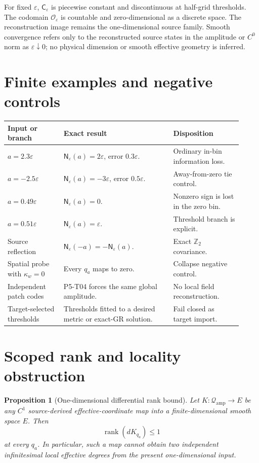 \documentclass[11pt]{article}
\newcommand{\Qamp}{\mathcal Q_{\mathrm{amp}}}
\newcommand{\Oeps}{\mathcal O_\varepsilon}
\newcommand{\Ceps}{\mathsf C_\varepsilon}
\newcommand{\Neps}{\mathsf N_\varepsilon}
\newtheorem{proposition}{Proposition}
\begin{document}
For fixed \(\varepsilon\), \(\Ceps\) is piecewise constant and discontinuous
at half-grid thresholds.  The codomain \(\Oeps\) is countable and
zero-dimensional as a discrete space.  The reconstruction image remains the
one-dimensional source family.  Smooth convergence refers only to the
reconstructed source states in the amplitude or \(C^0\) norm as
\(\varepsilon\downarrow0\); no physical dimension or smooth effective
geometry is inferred.

\section{Finite examples and negative controls}

\begin{longtable}{p{0.22\linewidth}p{0.43\linewidth}p{0.27\linewidth}}
\toprule
Input or branch & Exact result & Disposition\\
\midrule
\endhead
\(a=2.3\varepsilon\) &
\(\Neps(a)=2\varepsilon\), error \(0.3\varepsilon\). &
Ordinary in-bin information loss.\\
\(a=-2.5\varepsilon\) &
\(\Neps(a)=-3\varepsilon\), error \(0.5\varepsilon\). &
Away-from-zero tie control.\\
\(a=0.49\varepsilon\) &
\(\Neps(a)=0\). &
Nonzero sign is lost in the zero bin.\\
\(a=0.51\varepsilon\) &
\(\Neps(a)=\varepsilon\). &
Threshold branch is explicit.\\
Source reflection &
\(\Neps(-a)=-\Neps(a)\). &
Exact \(\mathbb Z_2\) covariance.\\
Spatial probe with \(\kappa_w=0\) &
Every \(q_a\) maps to zero. &
Collapse negative control.\\
Independent patch codes &
P5-T04 forces the same global amplitude. &
No local field reconstruction.\\
Target-selected thresholds &
Thresholds fitted to a desired metric or exact-GR solution. &
Fail closed as target import.\\
\bottomrule
\end{longtable}

\section{Scoped rank and locality obstruction}

\begin{proposition}[One-dimensional differential rank bound]
\label{prop:rank}
Let \(K:\Qamp\to E\) be any \(C^1\) source-derived effective-coordinate map
into a finite-dimensional smooth space \(E\).  Then
\[
 \operatorname{rank}(dK_{q_a})\leq1
\]
at every \(q_a\).  In particular, such a map cannot obtain two independent
infinitesimal local effective degrees from the present one-dimensional input.
\end{proposition}
\end{document}

